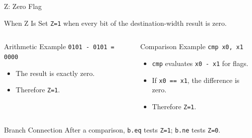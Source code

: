 \documentclass[aspectratio=169,11pt,t]{beamer}
\newcommand{\code}[1]{\texttt{#1}}
\begin{document}
\begin{frame}{Z: Zero Flag}
\begin{block}{When Z Is Set}
\code{Z=1} when every bit of the destination-width result is zero.
\end{block}
\vspace{0.2cm}
\begin{columns}[T,onlytextwidth]
\begin{block}{Arithmetic Example}
\large
\hspace{1.3cm}\code{0101 - 0101 = 0000}
\normalsize
\begin{itemize}
\item The result is exactly zero.
\item Therefore \code{Z=1}.
\end{itemize}
\end{block}
\begin{block}{Comparison Example}
\large
\hspace{1.5cm}\code{cmp x0, x1}
\normalsize
\begin{itemize}
\item \code{cmp} evaluates \code{x0 - x1} for flags.
\item If \code{x0 == x1}, the difference is zero.
\item Therefore \code{Z=1}.
\end{itemize}
\end{block}
\end{columns}
\vspace{0.15cm}
\begin{block}{Branch Connection}
After a comparison, \code{b.eq} tests \code{Z=1}; \code{b.ne} tests \code{Z=0}.
\end{block}
\end{frame}










\end{document}

